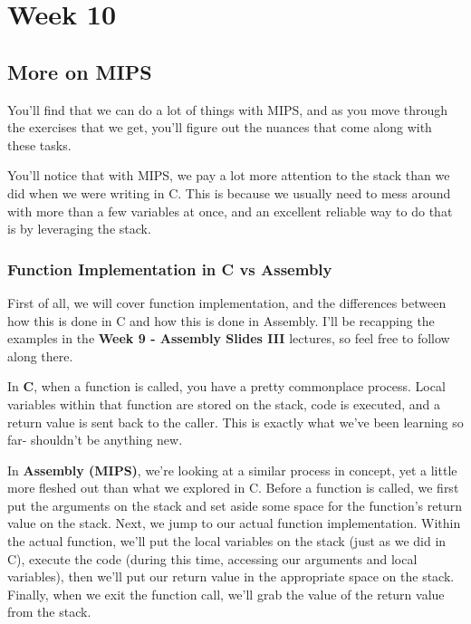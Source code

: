 \documentclass[english, 10pt]{article}
\begin{document}
\section{Week 10}

\subsection{More on MIPS}

You'll find that we can do a lot of things with MIPS, and as you move through the exercises that we get, you'll figure out the nuances that come along with these tasks.\newline

You'll notice that with MIPS, we pay a lot more attention to the stack than we did when we were writing in C. This is because we usually need to mess around with more than a few variables at once, and an excellent reliable way to do that is by leveraging the stack.

\subsubsection{Function Implementation in C vs Assembly}

First of all, we will cover function implementation, and the differences between how this is done in C and how this is done in Assembly. I'll be recapping the examples in the \textbf{Week 9 - Assembly Slides III} lectures, so feel free to follow along there.\newline

In \textbf{C}, when a function is called, you have a pretty commonplace process. Local variables within that function are stored on the stack, code is executed, and a return value is sent back to the caller. This is exactly what we've been learning so far- shouldn't be anything new.\newline

In \textbf{Assembly (MIPS)}, we're looking at a similar process in concept, yet a little more fleshed out than what we explored in C. Before a function is called, we first put the arguments on the stack and set aside some space for the function's return value on the stack. Next, we jump to our actual function implementation. Within the actual function, we'll put the local variables on the stack (just as we did in C), execute the code (during this time, accessing our arguments and local variables), then we'll put our return value in the appropriate space on the stack. Finally, when we exit the function call, we'll grab the value of the return value from the stack.\newline
\end{document}
